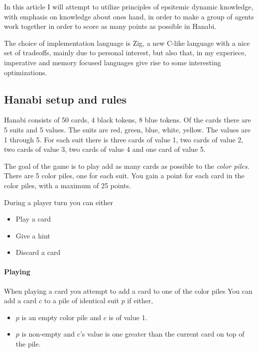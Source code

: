 In this article I will attempt to utilize principles of epsitemic dynamic knowledge, with emphasis on knowledge about ones hand, in order to make a group of agents work together in order to score as many points as possible in Hanabi. 

The choice of implementation language is Zig, a new C-like language with a nice set of tradeoffs, mainly due to personal interest, but also that, in my experiece, imperative and memory focused languages give rise to some interesting optimizations. 





\newpage
\subsection{Hanabi setup and rules}
Hanabi consists of 50 cards, 4 black tokens, 8 blue tokens.  Of the cards there are 5 suits and 5 values. The suits are red, green, blue, white, yellow. The values are 1 through 5. For each suit there is three cards of value 1, two cards of value 2, two cards of value 3, two cards of value 4 and one card of value 5.

The goal of the game is to play add as many cards as possible to the \emph{color piles}. There are 5 color piles, one for each suit. You gain a point for each card in the color piles, with a maximum of 25 points.

During a player turn you can either

\begin{itemize}
\item Play a card
\item Give a hint
\item Discard a card
\end{itemize}

\paragraph{Playing}
When playing a card you attempt to add a card to one of the color piles
You can add a card $c$ to a pile of identical suit $p$ if either, 

\begin{itemize}	
\item $p$ is an empty color pile and $c$ is of value 1.
\item $p$ is non-empty and $c$'s value is one greater than the current card on top of the pile.
\end{itemize}

